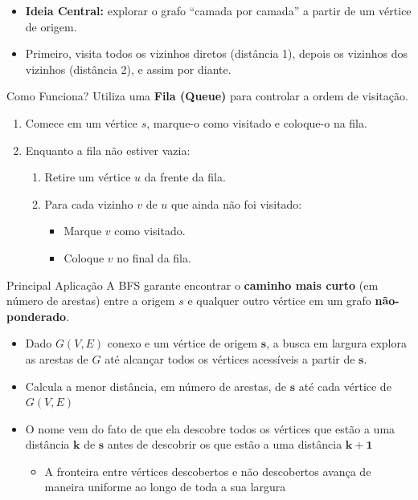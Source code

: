 \documentclass[xcolor=table]{beamer}
\begin{document}
\begin{frame}
  \begin{itemize}
    \item \textbf{Ideia Central:} explorar o grafo ``camada por camada'' a partir de um vértice de origem.
    \item Primeiro, visita todos os vizinhos diretos (distância 1), depois os vizinhos dos vizinhos (distância 2), e assim por diante.
  \end{itemize}
  \begin{block}{Como Funciona?}
    Utiliza uma \textbf{Fila (Queue)} para controlar a ordem de visitação.
    \begin{enumerate}
      \item Comece em um vértice $s$, marque-o como visitado e coloque-o na fila.
      \item Enquanto a fila não estiver vazia:
      \begin{enumerate}
        \item Retire um vértice $u$ da frente da fila.
        \item Para cada vizinho $v$ de $u$ que ainda não foi visitado:
        \begin{itemize}
          \item Marque $v$ como visitado.
          \item Coloque $v$ no final da fila.
        \end{itemize}
      \end{enumerate}
    \end{enumerate}
  \end{block}
  \begin{alertblock}{Principal Aplicação}
    A BFS garante encontrar o \textbf{caminho mais curto} (em número de arestas) entre a origem $s$ e qualquer outro vértice em um grafo \textbf{não-ponderado}.
  \end{alertblock}
\end{frame}

\begin{frame}
  \begin{itemize}
    \item Dado $G(V,E)$ conexo e um vértice de origem $\mathbf{s}$, a busca em largura explora as arestas de $G$ até alcançar todos os vértices acessíveis a partir de $\mathbf{s}$.
    \item Calcula a menor distância, em número de arestas, de $\mathbf{s}$ até cada vértice de $G(V,E)$
    \item O nome vem do fato de que ela descobre todos os vértices que estão a uma distância $\mathbf{k}$ de $\mathbf{s}$ antes de descobrir os que estão a uma distância $\mathbf{k+1}$
    \begin{itemize}
      \item A fronteira entre vértices descobertos e não descobertos avança de maneira uniforme ao longo de toda a sua largura
    \end{itemize}
  \end{itemize}
\end{frame}
\end{document}
